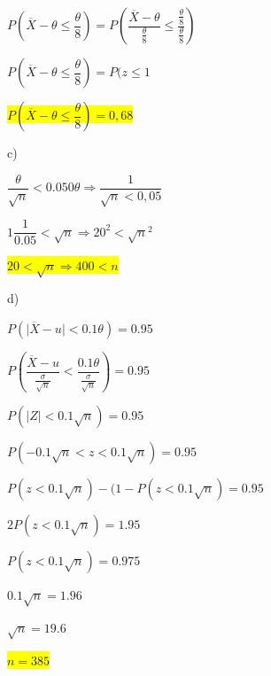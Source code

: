 \documentclass[a4paper,openright,12pt]{book}
\begin{document}
{\begin{center}
	$P( \overline{X} - \theta  \leq \dfrac{\theta}{8}) = P\left( \dfrac{\overline{X}- \theta}{\frac{\theta}{8}} \leq \dfrac{\frac{\theta}{8}}{\frac{\theta}{8}}\right)$ 
\end{center}
\begin{center}
	$ P( \overline{X} - \theta  \leq \dfrac{\theta}{8}) = P(z \leq 1$
\end{center}
\begin{center}
	\colorbox{yellow}{$P( \overline{X} - \theta  \leq \dfrac{\theta}{8}) = 0,68$} 
\end{center}
c)
\begin{center}
	$\dfrac{\theta}{\sqrt{n}} < 0.050\theta \Rightarrow \dfrac{1}{\sqrt{n} < 0,05}$
\end{center}
\begin{center}
	$1\dfrac{1}{0.05}<\sqrt{n} \Rightarrow 20^{2} < \sqrt{n}^{2}$
\end{center}
\begin{center}
	\colorbox{yellow}{$20 < \sqrt{n} \Rightarrow 400 < n$}
\end{center}
d)
\begin{center}
	$P(\mid \overline{X}-u \mid < 0.1\theta)=0.95$
\end{center}
\begin{center}
	$P\left( \dfrac{\overline{X}-u}{\frac{\sigma}{\sqrt{n}}} < \dfrac{0.1\theta}{\frac{\sigma}{\sqrt{n}}}\right)= 0.95$
\end{center}
\begin{center}
	$P(\mid Z \mid < 0.1\sqrt{n}) = 0.95$
\end{center}
\begin{center}
	$P(-0.1\sqrt{n} < z < 0.1\sqrt{n}) = 0.95$
\end{center}
\begin{center}
	$P(z < 0.1\sqrt{n})- (1-P(z < 0.1\sqrt{n}) = 0.95$
\end{center}
\begin{center}
	$2P( z < 0.1\sqrt{n}) = 1.95$
\end{center}
\begin{center}
	$P(z < 0.1\sqrt{n}) = 0.975$
\end{center}
\begin{center}
	$0.1\sqrt{n} = 1.96$
\end{center}
\begin{center}
	$\sqrt{n} = 19.6$
\end{center}
\begin{center}
	\colorbox{yellow}{$n = 385 $}
\end{center}


}
\end{document}

